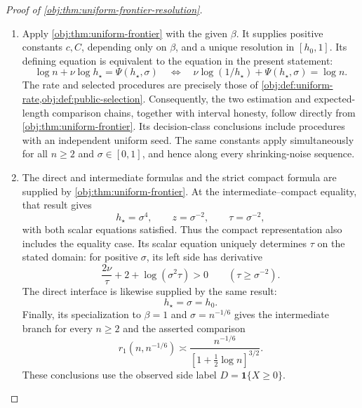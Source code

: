 \begin{proof}[Proof of \cref{obj:thm:uniform-frontier-resolution}]
\begin{enumerate}
\item Apply \cref{obj:thm:uniform-frontier} with the given \(\beta\). It supplies positive constants \(c,C\), depending only on \(\beta\), and a unique resolution in \([h_0,1]\). Its defining equation is equivalent to the equation in the present statement:
\[
\log n+\nu\log h_\star=\Psi(h_\star,\sigma)
\quad\Longleftrightarrow\quad
\nu\log(1/h_\star)+\Psi(h_\star,\sigma)=\log n.
\]
The rate and selected procedures are precisely those of
\cref{obj:def:uniform-rate,obj:def:public-selection}. Consequently, the two estimation and expected-length comparison chains, together with interval honesty, follow directly from \cref{obj:thm:uniform-frontier}. Its decision-class conclusions include procedures with an independent uniform seed. The same constants apply simultaneously for all \(n\ge2\) and \(\sigma\in[0,1]\), and hence along every shrinking-noise sequence.

\item The direct and intermediate formulas and the strict compact formula are supplied by \cref{obj:thm:uniform-frontier}. At the intermediate--compact equality, that result gives
\[
h_\star=\sigma^4,\qquad z=\sigma^{-2},\qquad \tau=\sigma^{-2},
\]
with both scalar equations satisfied. Thus the compact representation also includes the equality case. Its scalar equation uniquely determines \(\tau\) on the stated domain: for positive \(\sigma\), its left side has derivative
\[
\frac{2\nu}{\tau}+2+\log(\sigma^2\tau)>0
\qquad(\tau\ge\sigma^{-2}).
\]
The direct interface is likewise supplied by the same result:
\[
h_\star=\sigma=h_0.
\]
Finally, its specialization to \(\beta=1\) and \(\sigma=n^{-1/6}\) gives the intermediate branch for every \(n\ge2\) and the asserted comparison
\[
r_1(n,n^{-1/6})
\asymp
\frac{n^{-1/6}}{[1+\tfrac12\log n]^{3/2}}.
\]
These conclusions use the observed side label \(D=\mathbf1\{X\ge0\}\).
\end{enumerate}
\end{proof}
